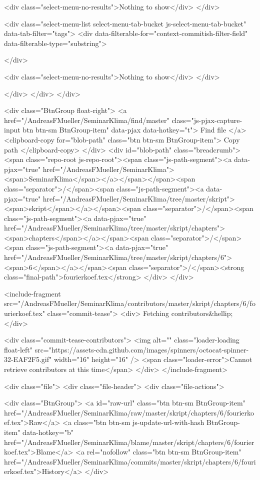           <div class="select-menu-no-results">Nothing to show</div>
      </div>

      <div class="select-menu-list select-menu-tab-bucket js-select-menu-tab-bucket" data-tab-filter="tags">
        <div data-filterable-for="context-commitish-filter-field" data-filterable-type="substring">


        </div>

        <div class="select-menu-no-results">Nothing to show</div>
      </div>

    </div>
  </div>
</div>

    <div class="BtnGroup float-right">
      <a href="/AndreasFMueller/SeminarKlima/find/master"
            class="js-pjax-capture-input btn btn-sm BtnGroup-item"
            data-pjax
            data-hotkey="t">
        Find file
      </a>
      <clipboard-copy for="blob-path" class="btn btn-sm BtnGroup-item">
        Copy path
      </clipboard-copy>
    </div>
    <div id="blob-path" class="breadcrumb">
      <span class="repo-root js-repo-root"><span class="js-path-segment"><a data-pjax="true" href="/AndreasFMueller/SeminarKlima"><span>SeminarKlima</span></a></span></span><span class="separator">/</span><span class="js-path-segment"><a data-pjax="true" href="/AndreasFMueller/SeminarKlima/tree/master/skript"><span>skript</span></a></span><span class="separator">/</span><span class="js-path-segment"><a data-pjax="true" href="/AndreasFMueller/SeminarKlima/tree/master/skript/chapters"><span>chapters</span></a></span><span class="separator">/</span><span class="js-path-segment"><a data-pjax="true" href="/AndreasFMueller/SeminarKlima/tree/master/skript/chapters/6"><span>6</span></a></span><span class="separator">/</span><strong class="final-path">fourierkoef.tex</strong>
    </div>
  </div>


  <include-fragment src="/AndreasFMueller/SeminarKlima/contributors/master/skript/chapters/6/fourierkoef.tex" class="commit-tease">
    <div>
      Fetching contributors&hellip;
    </div>

    <div class="commit-tease-contributors">
      <img alt="" class="loader-loading float-left" src="https://assets-cdn.github.com/images/spinners/octocat-spinner-32-EAF2F5.gif" width="16" height="16" />
      <span class="loader-error">Cannot retrieve contributors at this time</span>
    </div>
</include-fragment>


  <div class="file">
    <div class="file-header">
  <div class="file-actions">

    <div class="BtnGroup">
      <a id="raw-url" class="btn btn-sm BtnGroup-item" href="/AndreasFMueller/SeminarKlima/raw/master/skript/chapters/6/fourierkoef.tex">Raw</a>
        <a class="btn btn-sm js-update-url-with-hash BtnGroup-item" data-hotkey="b" href="/AndreasFMueller/SeminarKlima/blame/master/skript/chapters/6/fourierkoef.tex">Blame</a>
      <a rel="nofollow" class="btn btn-sm BtnGroup-item" href="/AndreasFMueller/SeminarKlima/commits/master/skript/chapters/6/fourierkoef.tex">History</a>
    </div>


